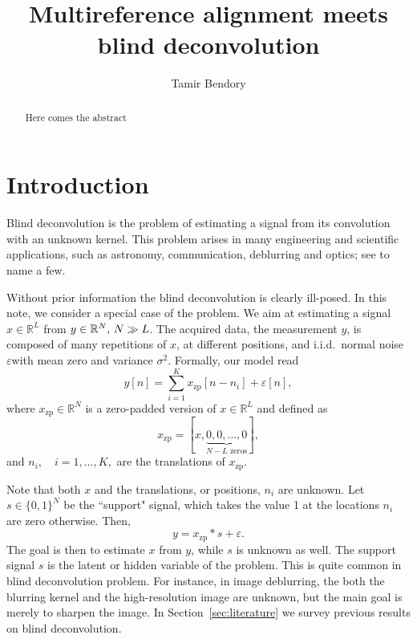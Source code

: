 \documentclass[12pt,a4paper]{article}
\numberwithin{equation}{section}
\numberwithin{figure}{section}
\theoremstyle{plain}
\theoremstyle{definition}
\theoremstyle{remark}
\theoremstyle{plain}
\theoremstyle{remark}
\theoremstyle{plain}
\theoremstyle{plain}
\newcommand{\RL}{\mathbb{R}^L}
\newcommand{\RN}{\mathbb{R}^N}
\newcommand{\xz}{x_{\textrm{zp}}}
\begin{document}


\title{Multireference alignment meets blind deconvolution}
\author{Tamir Bendory}
\maketitle

\begin{abstract}
	Here comes the abstract
\end{abstract}


\section{Introduction} \label{sec:introduction}

Blind deconvolution is the problem of estimating a signal from its convolution with an unknown kernel. This problem arises in many engineering and scientific applications, such as astronomy, communication, deblurring and optics; see   \cite{jefferies1993restoration,tong1994blind,chan1998total,campisi2016blind,kundur1996blind,levin2011understanding,shalvi1990new,levin2009understanding,krishnan2011blind,ayers1988iterative,michaeli2014blind} to name a few.

Without prior information the blind deconvolution is clearly ill-posed. In this note, we consider a special case of the problem. We aim at estimating a signal $x\in\RL$ from $y\in\RN, \thinspace N\gg L$. The acquired data, the measurement $y$, is composed of many repetitions of $x$, at different positions, and i.i.d.\ normal noise $\varepsilon $with mean zero and variance $\sigma^2$. 
Formally, our model read
\begin{equation}
y[n] = \sum_{i=1}^K \xz [n-n_i] + \varepsilon[n], 
\end{equation}
where $\xz\in\RN$ is a zero-padded version of $x\in\RL$ and 
defined as $$\xz  = [x, \underbrace{0,0,\ldots,0}_{N-L \text{ zeros}}],$$ and
 $n_i,\quad i=1,\ldots,K,$ are the translations of $\xz$.


Note that both $x$ and the translations, or positions, $n_i$ are unknown. Let $s\in\{0,1\}^N$ be the ``support" signal, which takes the value 1 at the locations $n_i$ are zero otherwise. 
Then, 
\begin{equation}
y = \xz \ast s + \varepsilon.
\end{equation}
The goal is then to estimate $x$ from $y$, while $s$ is unknown as well. The support signal $s$ is the latent or hidden variable of the problem. This is quite common in blind deconvolution problem. For instance, in image deblurring, the both the blurring kernel and the high-resolution image are unknown, but the main goal is merely to sharpen the image. In Section~\ref{sec:literature} we survey previous results on blind deconvolution.
\end{document}
